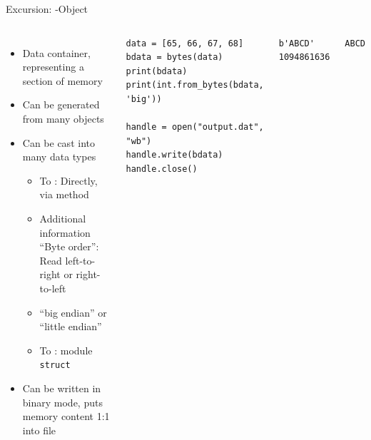 \begin{frame}[fragile]{Excursion: -Object}
%
\begin{columns}[T]
\begin{itemize}
\item Data container, representing a section of memory
\item Can be generated from many objects
\item Can be cast into many data types
	\begin{itemize}
	\item To : Directly, via method 
	\item Additional information \enquote{Byte order}: Read left-to-right or right-to-left
	\item \enquote{big endian} or \enquote{little endian}
	\item To : module \texttt{struct}
	\end{itemize}
\item Can be written in binary mode, puts memory content 1:1 into file
\end{itemize}
%
\vspace{-40pt}
\begin{codebox}
\begin{verbatim}
data = [65, 66, 67, 68]
bdata = bytes(data)
print(bdata)
print(int.from_bytes(bdata, 'big'))

handle = open("output.dat", "wb")
handle.write(bdata)
handle.close()
\end{verbatim}
\end{codebox}
%
\begin{cmdbox}
\begin{verbatim}
b'ABCD'
1094861636
\end{verbatim}
\end{cmdbox}
%
\begin{cmdbox}
\begin{verbatim}
ABCD
\end{verbatim}
\end{cmdbox}
\end{columns}
%
\end{frame}


